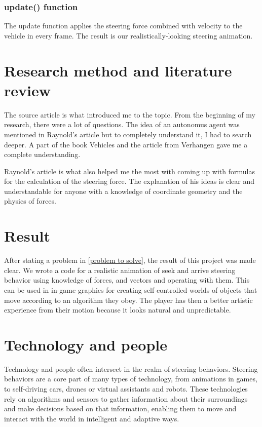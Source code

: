 \documentclass[10pt,twoside,english,a4paper]{article}
\begin{document}
\subsubsection{update() function} \label{updatef} 

The update function applies the steering force combined with velocity to the vehicle
in every frame. The result is our realistically-looking steering animation. 

\section{Research method and literature review} \label{research method} 

The source article \cite{Raynolds} is what introduced me to the topic. 
From the beginning of my research, there were a lot of questions. 
The idea of an autonomus agent was mentioned in Raynold's article
but to completely understand it, I had to search deeper. A part of the book Vehicles 
\cite{Braitenberg} and the article from Verhangen \cite{Verhagen} gave me a complete
understanding. 

Raynold's article is what also helped me the most with coming up with formulas for
the calculation of the steering force. The explanation of his ideas is clear and 
understandable for anyone with a knowledge of coordinate geometry 
and the physics of forces. 

\section{Result} \label{results} 

After stating a problem in \ref{problem to solve}, the result of this 
project was made clear. We wrote a code for a realistic animation of seek and arrive
steering behavior using knowledge of forces, and vectors and operating with them.  
This can be used in in-game graphics for creating self-controlled worlds 
of objects that move according to an algorithm they obey. The player 
has then a better artistic experience from their motion because it looks 
natural and unpredictable. 

\section{Technology and people} \label{technology and people} 

Technology and people often intersect in the realm of steering behaviors.
Steering behaviors are a core part of many types of technology, from animations in games,
to self-driving cars, drones or virtual assistants and robots. 
These technologies rely on algorithms and sensors to gather information about 
their surroundings and make decisions based 
on that information, enabling them to move and interact with the world 
in intelligent and adaptive ways. 
\end{document}

